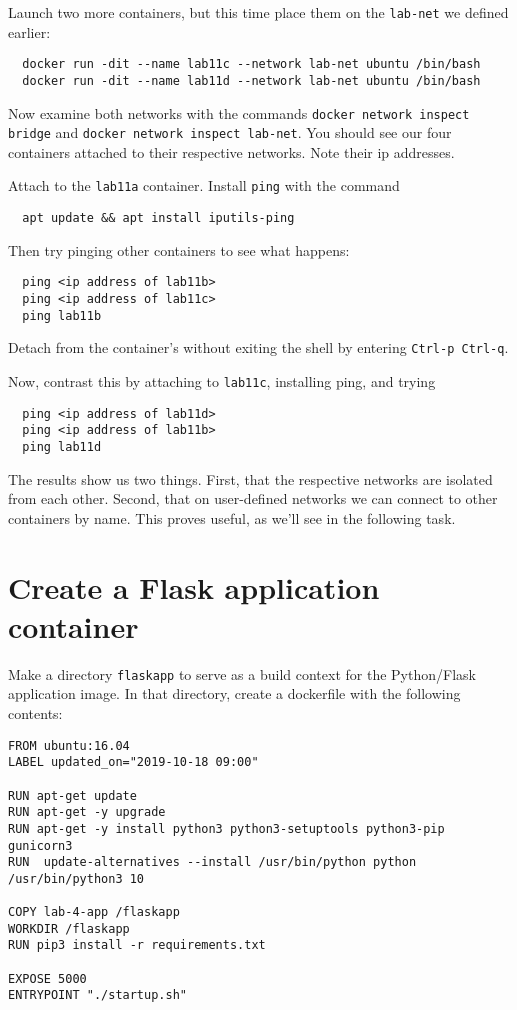 \documentclass{article}
\begin{document}
Launch two more containers, but this time place them on the \texttt{lab-net} we defined earlier:

\begin{verbatim}
  docker run -dit --name lab11c --network lab-net ubuntu /bin/bash
  docker run -dit --name lab11d --network lab-net ubuntu /bin/bash
\end{verbatim}

Now examine both networks with the commands \texttt{docker network inspect bridge} and \texttt{docker network inspect lab-net}. You should see our
four containers attached to their respective networks. Note their ip addresses.

Attach to the \texttt{lab11a} container. Install \texttt{ping} with the command 

\begin{verbatim}
  apt update && apt install iputils-ping
\end{verbatim}

Then try pinging other containers to see what happens:
\begin{verbatim}
  ping <ip address of lab11b>
  ping <ip address of lab11c>
  ping lab11b
\end{verbatim}
Detach from the container's without exiting the shell by entering \texttt{Ctrl-p Ctrl-q}.

Now, contrast this by attaching to \texttt{lab11c}, installing ping, and trying
\begin{verbatim}
  ping <ip address of lab11d>
  ping <ip address of lab11b>
  ping lab11d
\end{verbatim}

The results show us two things. First, that the respective networks are isolated from each other. Second, that on user-defined networks we can connect to other containers by name. This proves useful, as we'll see in the following task.



\section{Create a Flask application container}
Make a directory \texttt{flaskapp} to serve as a build context for the Python/Flask application image. In that directory, create a dockerfile with the following contents:

\begin{verbatim}
FROM ubuntu:16.04
LABEL updated_on="2019-10-18 09:00"

RUN apt-get update
RUN apt-get -y upgrade
RUN apt-get -y install python3 python3-setuptools python3-pip gunicorn3
RUN  update-alternatives --install /usr/bin/python python /usr/bin/python3 10

COPY lab-4-app /flaskapp
WORKDIR /flaskapp
RUN pip3 install -r requirements.txt

EXPOSE 5000
ENTRYPOINT "./startup.sh"
\end{verbatim}
\end{document}
